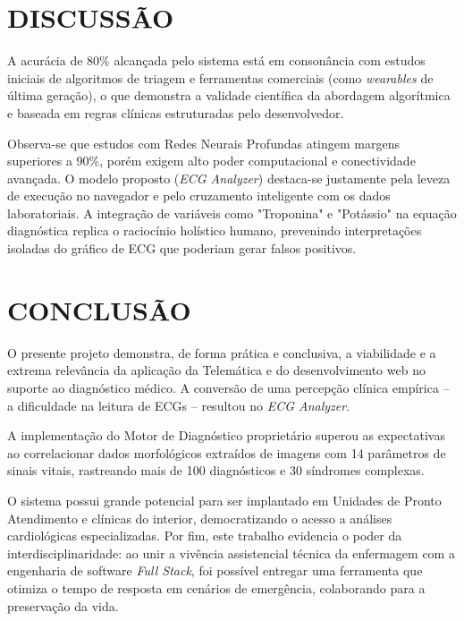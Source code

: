 \documentclass[portuguese,12pt,oneside,a4paper]{book}
\begin{document}
\chapter{DISCUSSÃO}

A acurácia de 80\% alcançada pelo sistema está em consonância com estudos iniciais de algoritmos de triagem e ferramentas comerciais (como \textit{wearables} de última geração), o que demonstra a validade científica da abordagem algorítmica e baseada em regras clínicas estruturadas pelo desenvolvedor. 

Observa-se que estudos com Redes Neurais Profundas atingem margens superiores a 90\%, porém exigem alto poder computacional e conectividade avançada. O modelo proposto (\textit{ECG Analyzer}) destaca-se justamente pela leveza de execução no navegador e pelo cruzamento inteligente com os dados laboratoriais. A integração de variáveis como "Troponina" e "Potássio" na equação diagnóstica replica o raciocínio holístico humano, prevenindo interpretações isoladas do gráfico de ECG que poderiam gerar falsos positivos.

\chapter{CONCLUSÃO}

O presente projeto demonstra, de forma prática e conclusiva, a viabilidade e a extrema relevância da aplicação da Telemática e do desenvolvimento web no suporte ao diagnóstico médico. A conversão de uma percepção clínica empírica – a dificuldade na leitura de ECGs – resultou no \textit{ECG Analyzer}.

A implementação do Motor de Diagnóstico proprietário superou as expectativas ao correlacionar dados morfológicos extraídos de imagens com 14 parâmetros de sinais vitais, rastreando mais de 100 diagnósticos e 30 síndromes complexas. 

O sistema possui grande potencial para ser implantado em Unidades de Pronto Atendimento e clínicas do interior, democratizando o acesso a análises cardiológicas especializadas. Por fim, este trabalho evidencia o poder da interdisciplinaridade: ao unir a vivência assistencial técnica da enfermagem com a engenharia de software \textit{Full Stack}, foi possível entregar uma ferramenta que otimiza o tempo de resposta em cenários de emergência, colaborando para a preservação da vida.
\end{document}
